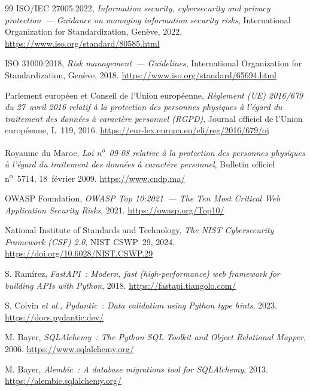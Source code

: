 \documentclass[a4paper,12pt,oneside]{report}
\begin{document}
\begin{thebibliography}{99}
		ISO/IEC 27005:2022, \textit{Information security, cybersecurity and privacy protection~---
			Guidance on managing information security risks}, International Organization for
		Standardization, Gen\`eve, 2022.
		\url{https://www.iso.org/standard/80585.html}
		
		ISO 31000:2018, \textit{Risk management~--- Guidelines}, International Organization for
		Standardization, Gen\`eve, 2018.
		\url{https://www.iso.org/standard/65694.html}
		
		Parlement europ\'een et Conseil de l'Union europ\'eenne, \textit{R\`eglement (UE) 2016/679
			du 27~avril 2016 relatif \`a la protection des personnes physiques \`a l'\'egard du traitement
			des donn\'ees \`a caract\`ere personnel (RGPD)}, Journal officiel de l'Union europ\'eenne,
		L~119, 2016.
		\url{https://eur-lex.europa.eu/eli/reg/2016/679/oj}
		
		Royaume du Maroc, \textit{Loi n\textsuperscript{o}~09-08 relative \`a la protection des
			personnes physiques \`a l'\'egard du traitement des donn\'ees \`a caract\`ere personnel},
		Bulletin officiel n\textsuperscript{o}~5714, 18~f\'evrier 2009.
		\url{https://www.cndp.ma/}
		
		OWASP Foundation, \textit{OWASP Top 10:2021~--- The Ten Most Critical Web Application
			Security Risks}, 2021.
		\url{https://owasp.org/Top10/}
		
		National Institute of Standards and Technology, \textit{The NIST Cybersecurity Framework
			(CSF) 2.0}, NIST CSWP~29, 2024.
		\url{https://doi.org/10.6028/NIST.CSWP.29}
		
		S. Ram\'irez, \textit{FastAPI~: Modern, fast (high-performance) web framework for building
			APIs with Python}, 2018.
		\url{https://fastapi.tiangolo.com/}
		
		S. Colvin \textit{et al.}, \textit{Pydantic~: Data validation using Python type hints}, 2023.
		\url{https://docs.pydantic.dev/}
		
		M. Bayer, \textit{SQLAlchemy~: The Python SQL Toolkit and Object Relational Mapper}, 2006.
		\url{https://www.sqlalchemy.org/}
		
		M. Bayer, \textit{Alembic~: A database migrations tool for SQLAlchemy}, 2013.
		\url{https://alembic.sqlalchemy.org/}
		

\end{thebibliography}
\end{document}
